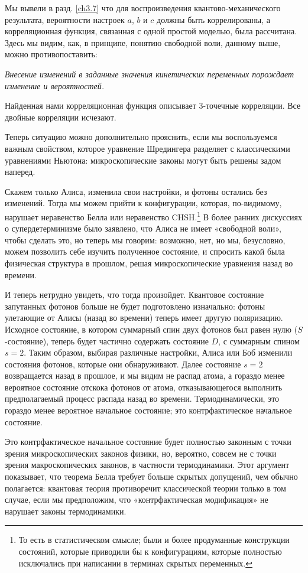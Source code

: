 \documentclass[main.tex]{subfiles}
\begin{document}
Мы вывели в разд. \ref{ch3.7} что для воспроизведения квантово-механического результата, вероятности настроек $a$, $b$ и $c$ должны быть коррелированы, а корреляционная функция, связанная с одной простой моделью, была рассчитана. Здесь мы видим, как, в принципе, понятию свободной воли, данному выше, можно противопоставить:

\textit{Внесение изменений в заданные значения кинетических переменных порождает изменение и вероятностей.}

Найденная нами корреляционная функция описывает 3-точечные корреляции. Все двойные корреляции исчезают.

Теперь ситуацию можно дополнительно прояснить, если мы воспользуемся важным свойством, которое уравнение Шредингера разделяет с классическими уравнениями Ньютона: микроскопические законы могут быть решены задом наперед.

Скажем только Алиса, изменила свои настройки, и фотоны остались без изменений. Тогда мы можем прийти к конфигурации, которая, по-видимому, нарушает неравенство Белла или неравенство CHSH.\footnote{То есть в статистическом смысле; были и более продуманные конструкции состояний, которые приводили бы к конфигурациям, которые полностью исключались при написании в терминах скрытых переменных.} В более ранних дискуссиях о супердетерминизме было заявлено, что Алиса не имеет «свободной воли», чтобы сделать это, но теперь мы говорим: возможно, нет, но мы, безусловно, можем позволить себе изучить полученное состояние, и спросить какой была физическая структура в прошлом, решая микроскопические уравнения назад во времени.

И теперь нетрудно увидеть, что тогда произойдет. Квантовое состояние запутанных фотонов больше не будет подготовлено изначально: фотоны улетающие от Алисы (назад во времени) теперь имеет другую поляризацию. Исходное состояние, в котором суммарный спин двух фотонов был равен нулю ($S$-состояние), теперь будет частично содержать состояние $D$, с суммарным спином $s = 2$. Таким образом, выбирая различные настройки, Алиса или Боб изменили состояния фотонов, которые они обнаруживают. Далее состояние $s = 2$ возвращается назад в прошлое, и мы видим не распад атома, а гораздо менее вероятное состояние отскока фотонов от атома, отказывающегося выполнить предполагаемый процесс распада назад во времени. Термодинамически, это гораздо менее вероятное начальное состояние; это контрфактическое начальное состояние.

Это контрфактическое начальное состояние будет полностью законным с точки зрения микроскопических законов физики, но, вероятно, совсем не с точки зрения макроскопических законов, в частности термодинамики. Этот аргумент показывает, что теорема Белла требует больше скрытых допущений, чем обычно полагается: квантовая теория противоречит классической теории только в том случае, если мы предположим, что «контрфактическая модификация» не нарушает законы термодинамики.
\end{document}
